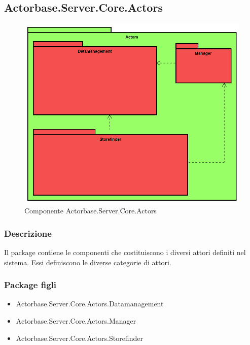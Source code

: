\documentclass[a4paper]{article}
\begin{document}
		\subsection{Actorbase.Server.Core.Actors}
			\begin{figure} [H]
			\centering
			\includegraphics[scale=0.50]{Server/Package/ActorsLevel.png}
			\caption{Componente Actorbase.Server.Core.Actors}
			\end{figure}
			\subsubsection{Descrizione}
				Il package contiene le componenti che costituiscono i diversi attori definiti nel sistema. Essi definiscono le diverse categorie di attori.
			\subsubsection{Package figli}
			\begin{itemize}
				\item Actorbase.Server.Core.Actors.Datamanagement
				\item Actorbase.Server.Core.Actors.Manager
				\item Actorbase.Server.Core.Actors.Storefinder
			\end{itemize}
			
\end{document}

